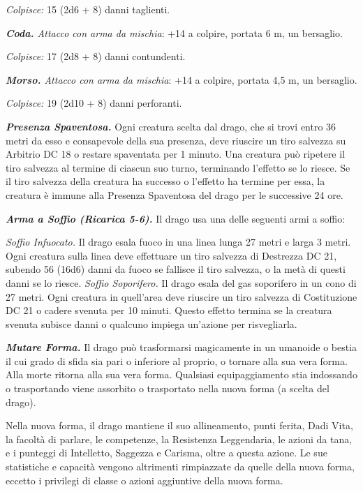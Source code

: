 \begin{multicols}{2}
\emph{Colpisce:} 15 (2d6 + 8) danni taglienti.

\emph{\textbf{Coda.} Attacco con arma da mischia}: +14 a colpire,
portata 6 m, un bersaglio.

\emph{Colpisce:} 17 (2d8 + 8) danni contundenti.

\emph{\textbf{Morso.} Attacco con arma da mischia}: +14 a colpire,
portata 4,5 m, un bersaglio.

\emph{Colpisce:} 19 (2d10 + 8) danni perforanti.

\emph{\textbf{Presenza Spaventosa.}} Ogni creatura scelta dal drago, che
si trovi entro 36 metri da esso e consapevole della sua presenza, deve
riuscire un tiro salvezza su Arbitrio DC 18 o restare spaventata per 1
minuto. Una creatura può ripetere il tiro salvezza al termine di ciascun
suo turno, terminando l'effetto se lo riesce. Se il tiro salvezza della
creatura ha successo o l'effetto ha termine per essa, la creatura è
immune alla Presenza Spaventosa del drago per le successive 24 ore.

\emph{\textbf{Arma a Soffio (Ricarica 5-6).}} Il drago usa una delle
seguenti armi a soffio:

\emph{Soffio Infuocato.} Il drago esala fuoco in una linea lunga 27
metri e larga 3 metri. Ogni creatura sulla linea deve effettuare un tiro
salvezza di Destrezza DC 21, subendo 56 (16d6) danni da fuoco se
fallisce il tiro salvezza, o la metà di questi danni se lo riesce.
\emph{Soffio Soporifero.} Il drago esala del gas soporifero in un cono
di 27 metri. Ogni creatura in quell'area deve riuscire un tiro salvezza
di Costituzione DC 21 o cadere svenuta per 10 minuti. Questo effetto
termina se la creatura svenuta subisce danni o qualcuno impiega
un'azione per risvegliarla.

\emph{\textbf{Mutare Forma.}} Il drago può trasformarsi magicamente in
un umanoide o bestia il cui grado di sfida sia pari o inferiore al
proprio, o tornare alla sua vera forma. Alla morte ritorna alla sua vera
forma. Qualsiasi equipaggiamento stia indossando o trasportando viene
assorbito o trasportato nella nuova forma (a scelta del drago).

Nella nuova forma, il drago mantiene il suo allineamento, punti ferita,
Dadi Vita, la facoltà di parlare, le competenze, la Resistenza
Leggendaria, le azioni da tana, e i punteggi di Intelletto, Saggezza e
Carisma, oltre a questa azione. Le sue statistiche e capacità vengono
altrimenti rimpiazzate da quelle della nuova forma, eccetto i privilegi
di classe o azioni aggiuntive della nuova forma.


\end{multicols}
